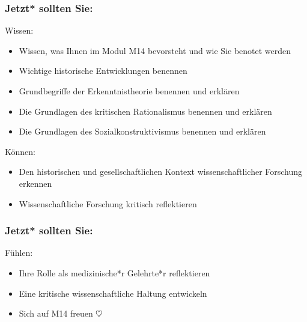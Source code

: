 \documentclass{beamer}
\newcommand{\heart}{\ensuremath\heartsuit} %
\begin{document}
\begin{frame}

\frametitle{Jetzt* sollten Sie:}



\begin{block}{Wissen:}
\begin{itemize}
\item
Wissen, was Ihnen im Modul M14 bevorsteht und wie Sie benotet werden

\item
Wichtige historische Entwicklungen benennen
\item 
Grundbegriffe der Erkenntnistheorie benennen und erklären
\item 
Die Grundlagen des kritischen Rationalismus benennen und erklären
\item 
Die Grundlagen des Sozialkonstruktivismus benennen und erklären
\end{itemize}

\end{block}

 

\begin{block}{Können:}
\begin{itemize}
\item
Den historischen und gesellschaftlichen Kontext wissenschaftlicher Forschung erkennen
\item 
Wissenschaftliche Forschung kritisch reflektieren
\end{itemize}
\end{block}

\end{frame}


\begin{frame}

\frametitle{Jetzt* sollten Sie:}

\begin{block}{Fühlen:}

\begin{itemize}
\item
Ihre Rolle als medizinische*r Gelehrte*r reflektieren
\item 
Eine kritische wissenschaftliche Haltung entwickeln
\item 
Sich auf M14 freuen $\heart$
\end{itemize}

\end{block}


\end{frame}
\end{document}
